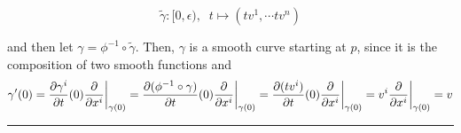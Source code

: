 \documentclass{article}
\newcommand{\restr}[2]{{%
  \left.\kern-\nulldelimiterspace %
  #1 %
  \vphantom{\big|} %
  \right|_{#2} %
  }}
\begin{document}
\[ \tilde{\gamma} : [0, \epsilon), \;\; t \mapsto (tv^1, \cdots tv^n) \]

and then let $\gamma = \phi^{-1} \circ \tilde{\gamma}$. Then, $\gamma$ is a smooth curve starting at $p$, since it is the composition of two smooth functions and
\[ \gamma'(0) = \frac{\partial \gamma^i}{\partial t}(0)\restr{\frac{\partial}{\partial x^i}}{\gamma(0)} = \frac{\partial (\phi^{-1} \circ \gamma)}{\partial t}(0)\restr{\frac{\partial}{\partial x^i}}{\gamma(0)} = \frac{\partial (tv^i)}{\partial t}(0)\restr{\frac{\partial}{\partial x^i}}{\gamma(0)} = v^i \restr{\frac{\partial}{\partial x^i}}{\gamma(0)} = v\] 

\vskip 0.5cm
\hrule 
\vskip 0.5cm








\end{document}
